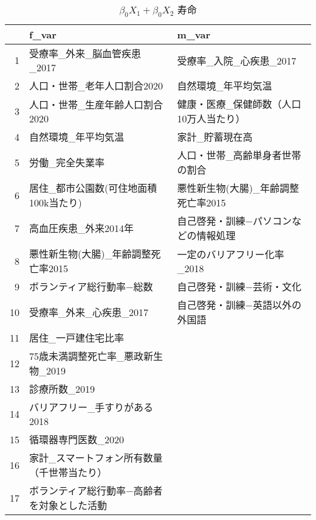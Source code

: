 \begin{table}[ht]
\centering
\begingroup
\begin{tabular}{rll}
  \hline
 & f\_var & m\_var \\
  \hline
1 & 受療率\_外来\_脳血管疾患\_2017 & 受療率\_入院\_心疾患\_2017 \\
  2 & 人口・世帯\_老年人口割合2020 & 自然環境\_年平均気温 \\
  3 & 人口・世帯\_生産年齢人口割合2020 & 健康・医療\_保健師数（人口10万人当たり） \\
  4 & 自然環境\_年平均気温 & 家計\_貯蓄現在高 \\
  5 & 労働\_完全失業率 & 人口・世帯\_高齢単身者世帯の割合 \\
  6 & 居住\_都市公園数(可住地面積100k当たり) & 悪性新生物(大腸)\_年齢調整死亡率2015 \\
  7 & 高血圧疾患\_外来2014年 & 自己啓発・訓練−パソコンなどの情報処理 \\
  8 & 悪性新生物(大腸)\_年齢調整死亡率2015 & 一定のバリアフリー化率\_2018 \\
  9 & ボランティア総行動率−総数 & 自己啓発・訓練−芸術・文化 \\
  10 & 受療率\_外来\_心疾患\_2017 & 自己啓発・訓練−英語以外の外国語 \\
  11 & 居住\_一戸建住宅比率 &  \\
  12 & 75歳未満調整死亡率\_悪政新生物\_2019 &  \\
  13 & 診療所数\_2019 &  \\
  14 & バリアフリー\_手すりがある2018 &  \\
  15 & 循環器専門医数\_2020 &  \\
  16 & 家計\_スマートフォン所有数量（千世帯当たり） &  \\
  17 & ボランティア総行動率−高齢者を対象とした活動 &  \\
   \hline
\end{tabular}
\endgroup
\caption[bbb]{$\beta_0
  X_1+
  \beta_0 X_2$
  寿命}
\label{tablelabel}
\end{table}

